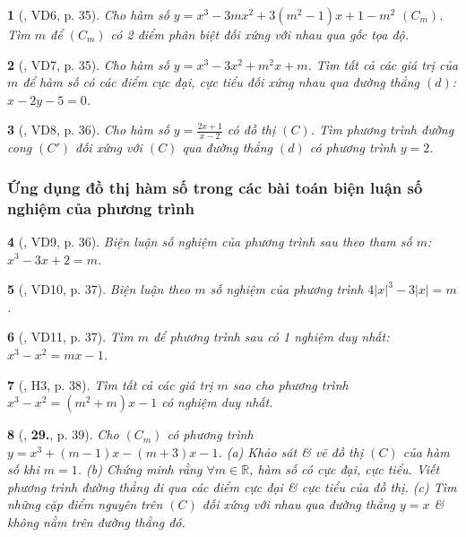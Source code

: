 \documentclass{article}
\newtheorem{baitoan}{}
\begin{document}
\begin{baitoan}[\cite{TLCT_giai_tich_12}, VD6, p. 35]
	Cho hàm số $y = x^3 - 3mx^2 + 3(m^2 - 1)x + 1 - m^2$ $(C_m)$. Tìm $m$ để $(C_m)$ có 2 điểm phân biệt đối xứng với nhau qua gốc tọa độ.
\end{baitoan}

\begin{baitoan}[\cite{TLCT_giai_tich_12}, VD7, p. 35]
	Cho hàm số $y = x^3 - 3x^2 + m^2x + m$. Tìm tất cả các giá trị của $m$ để hàm số có các điểm cực đại, cực tiểu đối xứng nhau qua đường thẳng $(d)$: $x - 2y - 5 = 0$.
\end{baitoan}

\begin{baitoan}[\cite{TLCT_giai_tich_12}, VD8, p. 36]
	Cho hàm số $y = \frac{2x + 1}{x - 2}$ có đồ thị $(C)$. Tìm phương trình đường cong $(C')$ đối xứng với $(C)$ qua đường thẳng $(d)$ có phương trình $y = 2$. 
\end{baitoan}

\subsubsection{Ứng dụng đồ thị hàm số trong các bài toán biện luận số nghiệm của phương trình}

\begin{baitoan}[\cite{TLCT_giai_tich_12}, VD9, p. 36]
	Biện luận số nghiệm của phương trình sau theo tham số $m$: $x^3 - 3x + 2 = m$.
\end{baitoan}

\begin{baitoan}[\cite{TLCT_giai_tich_12}, VD10, p. 37]
	Biện luận theo $m$ số nghiệm của phương trình $4|x|^3 - 3|x| = m$.
\end{baitoan}

\begin{baitoan}[\cite{TLCT_giai_tich_12}, VD11, p. 37]
	Tìm $m$ để phương trình sau có 1 nghiệm duy nhất: $x^3 - x^2 = mx - 1$.
\end{baitoan}

\begin{baitoan}[\cite{TLCT_giai_tich_12}, H3, p. 38]
	Tìm tất cả các giá trị $m$ sao cho phương trình $x^3 - x^2 = (m^2 + m)x - 1$ có nghiệm duy nhất.
\end{baitoan}

\begin{baitoan}[\cite{TLCT_giai_tich_12}, \textbf{29.}, p. 39]
	Cho $(C_m)$ có phương trình $y = x^3 + (m - 1)x - (m + 3)x - 1$. (a) Khảo sát \& vẽ đồ thị $(C)$ của hàm số khi $m = 1$. (b) Chứng minh rằng $\forall m\in\mathbb{R}$, hàm số có cực đại, cực tiểu. Viết phương trình đường thẳng đi qua các điểm cực đại \& cực tiểu của đồ thị. (c) Tìm những cặp điểm nguyên trên $(C)$ đối xứng với nhau qua đường thẳng $y = x$ \& không nằm trên đường thẳng đó.	
\end{baitoan}
\end{document}
